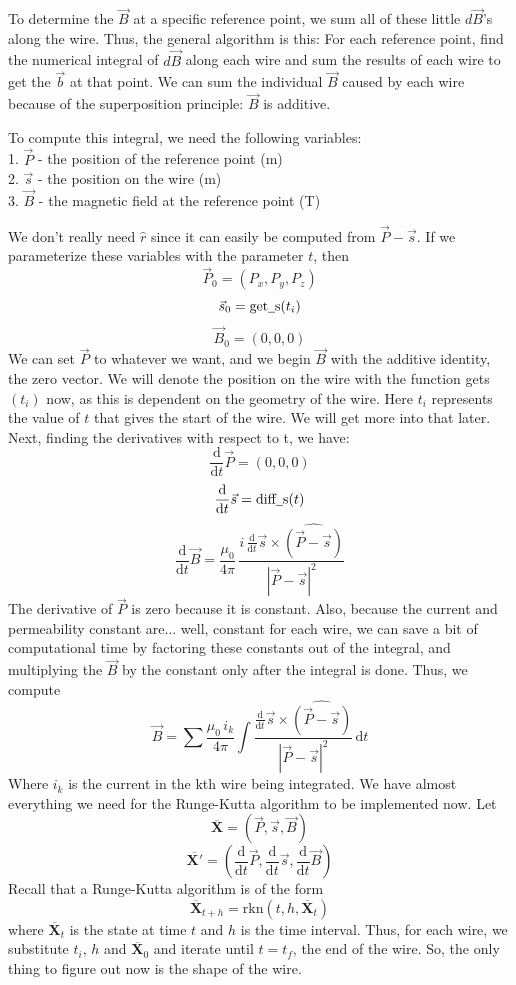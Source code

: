 \documentclass[12pt]{article}
\newcommand{\bfvec}[1]{\overline{\mathbf{#1}}}
\newcommand{\spaces}{\phantom{\qquad}}
\newcommand{\under}{\underline{\phantom{\enspace}}}
\newcommand{\diff}{\frac{\mathrm{d}}{\mathrm{d}t}}
\newcommand{\dif}{\mathrm{d}}
\begin{document}
	To determine the $\vec{B}$ at a specific reference point, we sum all of these little $d\vec{B}$'s along the wire. Thus, the general algorithm is this: For each reference point, find the numerical integral of $d\vec{B}$ along each wire and sum the results of each wire to get the $\vec{b}$ at that point. We can sum the individual $\vec{B}$ caused by each wire because of the superposition principle: $\vec{B}$ is additive.
	
	To compute this integral, we need the following variables: \\
		\spaces 1. $\vec{P}$ - the position of the reference point (m)\\
		\spaces 2. $\vec{s}$ - the position on the wire (m)\\
		\spaces 3. $\vec{B}$ - the magnetic field at the reference point (T)
		
	We don't really need $\hat{r}$ since it can easily be computed from $\vec{P} - \vec{s}$. If we parameterize these variables with the parameter $t$, then
			$$\vec{P}_0 = (P_x, P_y, P_z)$$
			$$\vec{s}_0 = \text{get\under s}(t_i)$$
			$$\vec{B}_0 = (0, 0, 0)$$
	We can set $\vec{P}$ to whatever we want, and we begin $\vec{B}$ with the additive identity, the zero vector. We will denote the position on the wire with the function get\under s$(t_i)$ now, as this is dependent on the geometry of the wire. Here $t_i$ represents the value of $t$ that gives the start of the wire. We will get more into that later. Next, finding the derivatives with respect to t, we have:
			$$\diff \vec{P} = (0, 0, 0)$$
			$$\diff \vec{s} = \text{diff\under s}(t)$$
			$$\diff \vec{B} = \frac{\mu_0}{4\pi} \, \frac{i\,\diff \vec{s} \times \widehat{(\vec{P} - \vec{s})}}{|\vec{P} - \vec{s}|^2}$$	
	The derivative of $\vec{P}$ is zero because it is constant. Also, because the current and permeability constant are... well, constant for each wire, we can save a bit of computational time by factoring these constants out of the integral, and multiplying the $\vec{B}$ by the constant only after the integral is done. Thus, we compute
			$$\vec{B} = \sum \frac{\mu_0 \, i_k}{4\pi}\int\frac{\diff \vec{s} \times \widehat{(\vec{P} - \vec{s})}}{|\vec{P} - \vec{s}|^2} \, \dif t$$	
	Where $i_k$ is the current in the kth wire being integrated. We have almost everything we need for the Runge-Kutta algorithm to be implemented now. Let
			$$\bfvec{X} = (\vec{P},\vec{s},\vec{B})$$
			$$\bfvec{X'} = \left(\diff\vec{P},\diff\vec{s},\diff\vec{B}\right)$$
	Recall that a Runge-Kutta algorithm is of the form
			$$\bfvec{X}_{t+h} = \mathrm{rkn}(t,h,\bfvec{X}_t)$$
	where $\bfvec{X}_t$ is the state at time $t$ and $h$ is the time interval. Thus, for each wire, we substitute $t_i$, $h$ and $\bfvec{X}_0$ and iterate until $t = t_f$, the end of the wire. So, the only thing to figure out now is the shape of the wire. 
	
\end{document}
